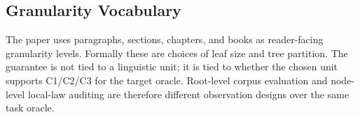 \subsection{Granularity Vocabulary}

The paper uses paragraphs, sections, chapters, and books as reader-facing
granularity levels. Formally these are choices of leaf size and tree
partition. The guarantee is not tied to a linguistic unit; it is tied to
whether the chosen unit supports C1/C2/C3 for the target oracle. Root-level
corpus evaluation and node-level local-law auditing are therefore different
observation designs over the same task oracle.
